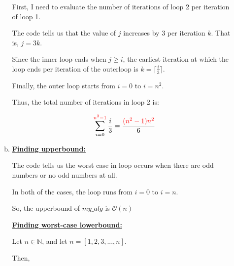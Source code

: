 \documentclass[12pt]{article}
\begin{document}
\begin{enumerate}[1.]
\begin{enumerate}[a)]
\begin{mdframed}
            First, I need to evaluate the number of iterations of loop 2 per iteration of loop 1.

            \bigskip

            The code tells us that the value of $j$ increases by 3 per iteration $k$. That is, $j = 3k$.

            \bigskip

            Since the inner loop ends when $j \geq i$, the earliest iteration at which
            the loop ends per iteration of the outerloop is $k = \lceil \frac{i}{3} \rceil$.

            \bigskip

            Finally, the outer loop starts from $i = 0$ to $i = n^2$.

            \bigskip

            Thus, the total number of iterations in loop 2 is:

            \setcounter{equation}{0}
            \begin{align}
                \sum\limits_{i=0}^{\color{red}n^2-1\color{black}} \frac{i}{3} = \frac{\color{red}(n^2-1)n^2\color{black}}{6}
            \end{align}

            \bigskip

        \end{mdframed}

        \item

        \underline{\textbf{Finding upperbound:}}

        \bigskip

        The code tells us the worst case in loop occurs when there are odd numbers
        or no odd numbers at all.

        \bigskip

        In both of the cases, the loop runs from $i = 0$ to $i = n$.

        \bigskip

        So, the upperbound of $my\_alg$ is $\mathcal{O}(n)$

        \bigskip

        \underline{\textbf{Finding worst-case lowerbound:}}

        \bigskip

        Let $n \in \mathbb{N}$, and let $n = [1,2,3,...,n]$.

        \bigskip

        Then,


\end{enumerate}
\end{enumerate}
\end{document}
